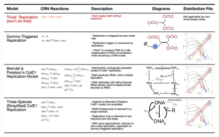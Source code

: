 \documentclass[preprint,12pt]{oldplainarticle}
\begin{document}
\begin{figure}[!ht]
\includegraphics[width=8.5in, angle=90]{figures/main_table.png}
\label{fig:main_table}
\end{figure}
\pagebreak
\end{document}

